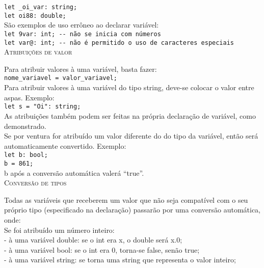 \documentclass[12pt,a4paper]{article}
\begin{document}
\texttt{\noindent let \_oi\_var: string;\\
\indent let oi88: double;}\\

São exemplos de uso errôneo ao declarar variável:\\

\texttt{\noindent let 9var: int; -{}- não se inicia com números\\
\indent let var@: int; -{}- não é permitido o uso de caracteres especiais}\\[0.3cm]

\hypertarget{label2}{\Large{\textsc{Atribuições de valor}}}\\
\normalsize

Para atribuir valores à uma variável, basta fazer: \\

\texttt{nome\_variavel = valor\_variavel;}\\

Para atribuir valores à uma variável do tipo string, deve-se colocar o valor entre aspas. Exemplo:\\

\texttt{\noindent let s = "Oi": string;}\\

As atribuições também podem ser feitas na própria declaração de variável, como demonstrado. \\

Se por ventura for atribuído um valor diferente do do tipo da variável, então será automaticamente convertido. Exemplo:\\

\texttt{\noindent let b: bool; \\
\indent b = 861;}\\

b após a conversão automática valerá ``true''.\\[0.3cm]

\hypertarget{label8}{\Large{\textsc{Conversão de tipos}}}\\
\normalsize

Todas as variáveis que receberem um valor que não seja compatível com o seu próprio tipo (especificado na declaração) passarão por uma conversão automática, onde: \\

Se foi atribuído um número inteiro:\\[0.15cm]
- à uma variável double: se o int era x, o double será x.0;\\
- à uma variável bool: se o int era 0, torna-se false, senão true;\\
- à uma variável string: se torna uma string que representa o valor inteiro;\\[0.3cm]
\end{document}
